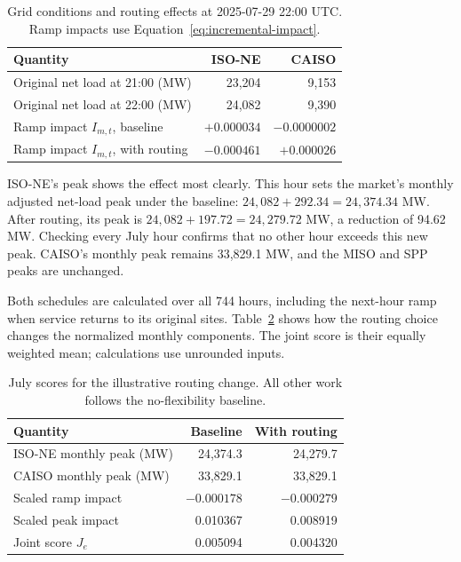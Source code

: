 \documentclass{UNCC-thesis}
\begin{document}
\begin{table}[htbp]
  \centering
  \footnotesize
  \caption{Grid conditions and routing effects at 2025-07-29 22:00 UTC.
  Ramp impacts use Equation~\eqref{eq:incremental-impact}.}
  \label{tab:joint-example-hour}
  \begin{tabular}{@{}lrr@{}}
    \toprule
    Quantity & ISO-NE      & CAISO \\
    \midrule
    Original net load at 21:00 (MW) & 23,204 & 9,153 \\
    Original net load at 22:00 (MW) & 24,082 & 9,390 \\
    Ramp impact \(I_{m,t}\), baseline & \(+0.000034\) & \(-0.0000002\) \\
    Ramp impact \(I_{m,t}\), with routing & \(-0.000461\) & \(+0.000026\) \\
    \bottomrule
  \end{tabular}
\end{table}

ISO-NE's peak shows the effect most clearly. This hour sets the market's monthly adjusted
net-load peak under the baseline: \(24{,}082+292.34=24{,}374.34\) MW.
After routing, its peak is \(24{,}082+197.72=24{,}279.72\) MW, a reduction
of 94.62 MW. Checking every July hour confirms that no other hour exceeds
this new peak. CAISO's monthly peak remains 33,829.1 MW, and the MISO and
SPP peaks are unchanged.

Both schedules are calculated over all 744 hours, including the next-hour
ramp when service returns to its original sites.
Table~\ref{tab:joint-example-month} shows how the routing choice changes
the normalized monthly components. The joint score is their equally
weighted mean; calculations use unrounded inputs.

\begin{table}[htbp]
  \centering
  \footnotesize
  \caption{July scores for the illustrative routing change. All other work
  follows the no-flexibility baseline.}
  \label{tab:joint-example-month}
  \begin{tabular}{@{}lrr@{}}
    \toprule
    Quantity & Baseline & With routing \\
    \midrule
    ISO-NE monthly peak (MW) & 24,374.3 & 24,279.7 \\
    CAISO monthly peak (MW) & 33,829.1 & 33,829.1 \\
    Scaled ramp impact & \(-0.000178\) & \(-0.000279\) \\
    Scaled peak impact & 0.010367 & 0.008919 \\
    Joint score \(J_e\) & 0.005094 & 0.004320 \\
    \bottomrule
  \end{tabular}
\end{table}
\end{document}
